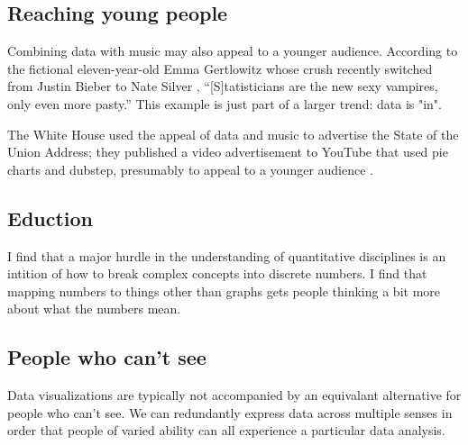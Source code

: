 \documentclass{acm_proc_article-sp}
\begin{document}
\subsection{Reaching young people}
Combining data with music may also appeal to a younger audience.
According to the fictional eleven-year-old Emma Gertlowitz whose crush
recently switched from Justin Bieber to Nate Silver \cite{emma},
``[S]tatisticians are the new sexy vampires, only even more pasty.''
This example is just part of a larger trend: data is "in".

The White House used the appeal of data and music to advertise the State
of the Union Address; they published a video advertisement to YouTube that
used pie charts and dubstep, presumably to appeal to a younger audience \cite{whitehouse}.

\subsection{Eduction}
I find that a major hurdle in the understanding of quantitative disciplines
is an intition of how to break complex concepts into discrete numbers.
I find that mapping numbers to things other than graphs gets people thinking
a bit more about what the numbers mean.

\subsection{People who can't see}
Data visualizations are typically not accompanied by an equivalant
alternative for people who can't see. We can redundantly express data
across multiple senses in order that people of varied ability can all
experience a particular data analysis.



\balancecolumns
\end{document}
